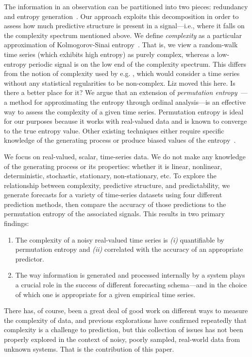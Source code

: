 
The information in an observation can be partitioned into two pieces:
redundancy and entropy generation~\cite{crutchfield2003}.
\label{page:redundancy}
Our approach exploits this decomposition in order to assess how much
predictive structure is present in a signal---i.e., where it falls on
the complexity spectrum mentioned above.  We define \emph{complexity}
as a particular approximation of Kolmogorov-Sinai
entropy~\cite{lind95}.  That is, we view a random-walk time series
(which exhibits high entropy) as purely complex, whereas a low-entropy
periodic signal is on the low end of the complexity spectrum.
\alert{This differs from the notion of complexity used by
  e.g. \cite{Shalizi2008}, which would consider a time series without
  any statistical regularities to be non-complex.  Liz moved this
  here.  Is there a better place for it?}  We argue that an extension
of \emph{permutation entropy}~\cite{bandt2002per}---a method for
approximating the entropy through ordinal analysis---is an effective
way to assess the complexity of a given time series.  Permutation
entropy is ideal for our purposes because it works with real-valued
data and is known to converge to the true entropy value. Other
existing techniques either require specific knowledge of the
generating process or produce biased values of the
entropy~\cite{bollt2001}.

We focus on real-valued, scalar, time-series data.
%
%
We do not make any knowledge of the generating process or its
properties: whether it is linear, nonlinear, deterministic,
stochastic, stationary, non-stationary, etc.  To explore the
relationship between complexity, predictive structure, and
predictability, we generate forecasts for a variety of time-series
datasets using four different prediction methods, then compare the
accuracy of those predictions to the permutation entropy of the
associated signals.  This results in two primary findings:
\begin{enumerate}
\item The complexity of a noisy real-valued time series is \emph{(i)}
  quantifiable by permutation entropy and \emph{(ii)} correlated with
  the accuracy of an appropriate predictor.
\item The way information is generated and processed internally by a
  system plays a crucial role in the success of different forecasting
  schema---and in the choice of which one is appropriate for a given
  empirical time series.
\end{enumerate}
There has, of course, been a great deal of good work on different ways
to measure the complexity of data, and previous explorations have
confirmed repeatedly that complexity is a challenge to prediction, but
this collection of issues has not been properly explored in the
context of noisy, poorly sampled, real-world data from unknown
systems.  That is the contribution of this paper.

